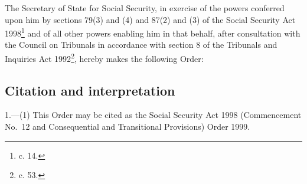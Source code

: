 \documentclass[12pt,a4paper]{article}
\title{\regstitle}
\author{S.I. 1999 No. 3178 (C. 81)}
\date{Made
25th November 1999\\
}
\begin{document}
\maketitle

\noindent
The Secretary of State for Social Security, in exercise of the powers conferred upon him by sections 79(3) and (4) and 87(2) and (3) of the Social Security Act 1998\footnote{ c. 14.} and of all other powers enabling him in that behalf, after consultation with the Council on Tribunals in accordance with section 8 of the Tribunals and Inquiries Act 1992\footnote{ c. 53.}, hereby makes the following Order:  

{\sloppy

\tableofcontents

}

\bigskip

\setcounter{secnumdepth}{-2}

\subsection[1. Citation and interpretation]{Citation and interpretation}

1.---(1)  This Order may be cited as the Social Security Act 1998 (Commencement No.\ 12 and Consequential and Transitional Provisions) Order 1999.
\end{document}
